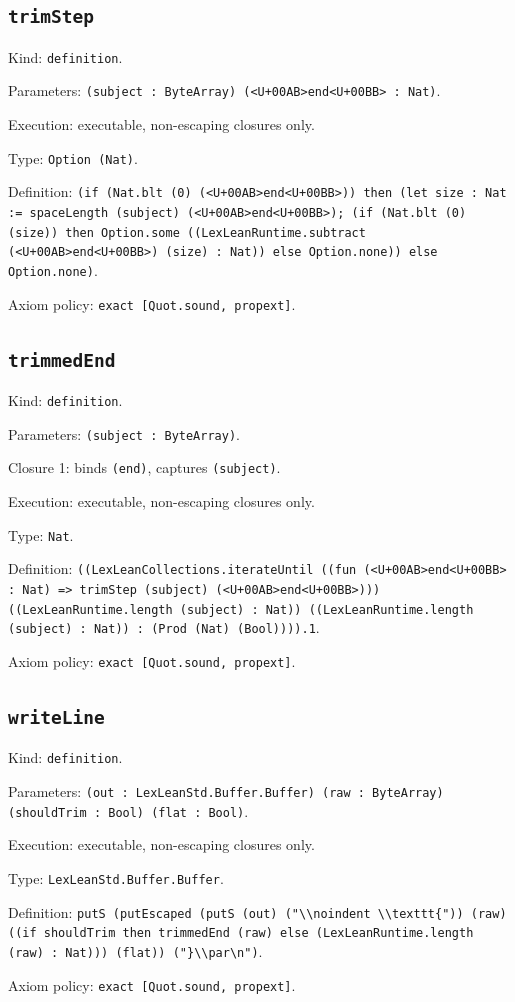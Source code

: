 \documentclass[11pt]{article}
\begin{document}
\subsection*{\texttt{trimStep}}
\noindent Kind: \texttt{definition}.\par
\noindent Parameters: \texttt{(subject : ByteArray) (<U+00AB>end<U+00BB> : Nat)}.\par
\noindent Execution: executable, non-escaping closures only.\par
\noindent Type: \texttt{Option (Nat)}.\par
\noindent Definition: \texttt{(if (Nat.blt (0) (<U+00AB>end<U+00BB>)) then (let size : Nat := spaceLength (subject) (<U+00AB>end<U+00BB>); (if (Nat.blt (0) (size)) then Option.some ((LexLeanRuntime.subtract (<U+00AB>end<U+00BB>) (size) : Nat)) else Option.none)) else Option.none)}.\par
\noindent Axiom policy: \texttt{exact [Quot.sound, propext]}.\par
\subsection*{\texttt{trimmedEnd}}
\noindent Kind: \texttt{definition}.\par
\noindent Parameters: \texttt{(subject : ByteArray)}.\par
\noindent Closure 1: binds \texttt{(end)}, captures \texttt{(subject)}.\par
\noindent Execution: executable, non-escaping closures only.\par
\noindent Type: \texttt{Nat}.\par
\noindent Definition: \texttt{((LexLeanCollections.iterateUntil ((fun (<U+00AB>end<U+00BB> : Nat) => trimStep (subject) (<U+00AB>end<U+00BB>))) ((LexLeanRuntime.length (subject) : Nat)) ((LexLeanRuntime.length (subject) : Nat)) : (Prod (Nat) (Bool)))).1}.\par
\noindent Axiom policy: \texttt{exact [Quot.sound, propext]}.\par
\subsection*{\texttt{writeLine}}
\noindent Kind: \texttt{definition}.\par
\noindent Parameters: \texttt{(out : LexLeanStd.Buffer.Buffer) (raw : ByteArray) (shouldTrim : Bool) (flat : Bool)}.\par
\noindent Execution: executable, non-escaping closures only.\par
\noindent Type: \texttt{LexLeanStd.Buffer.Buffer}.\par
\noindent Definition: \texttt{putS (putEscaped (putS (out) ("\textbackslash{}\textbackslash{}noindent \textbackslash{}\textbackslash{}texttt\{")) (raw) ((if shouldTrim then trimmedEnd (raw) else (LexLeanRuntime.length (raw) : Nat))) (flat)) ("\}\textbackslash{}\textbackslash{}par\textbackslash{}n")}.\par
\noindent Axiom policy: \texttt{exact [Quot.sound, propext]}.\par
\end{document}
